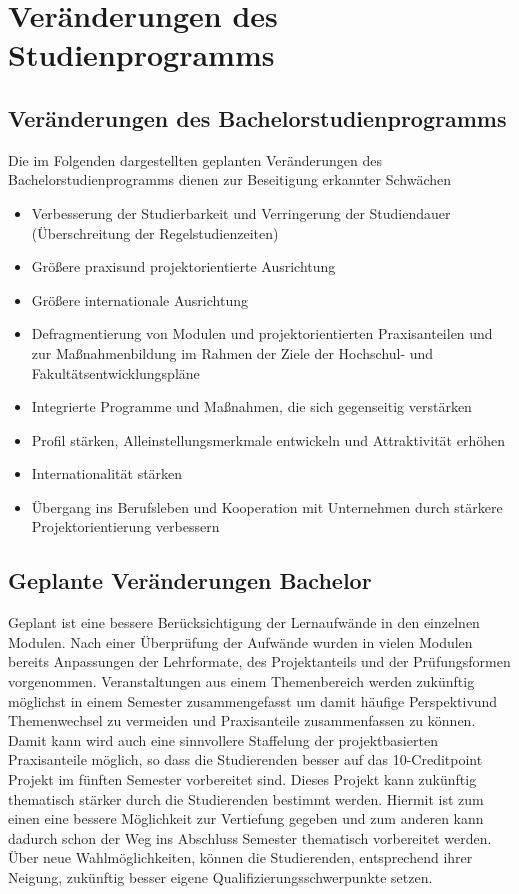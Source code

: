 \chapter{Veränderungen des
Studienprogramms}\label{veruxe4nderungen-des-studienprogramms}

\section{Veränderungen des
Bachelorstudienprogramms}\label{veruxe4nderungen-des-bachelorstudienprogramms}

Die im Folgenden dargestellten geplanten Veränderungen des
Bachelorstudienprogramms dienen zur Beseitigung erkannter Schwächen

\begin{itemize}
\tightlist
\item
  Verbesserung der Studierbarkeit und Verringerung der Studiendauer
  (Überschreitung der Regelstudienzeiten)
\item
  Größere praxisund projektorientierte Ausrichtung
\item
  Größere internationale Ausrichtung
\item
  Defragmentierung von Modulen und projektorientierten Praxisanteilen
  und zur Maßnahmenbildung im Rahmen der Ziele der Hochschul- und
  Fakultätsentwicklungspläne
\item
  Integrierte Programme und Maßnahmen, die sich gegenseitig verstärken
\item
  Profil stärken, Alleinstellungsmerkmale entwickeln und Attraktivität
  erhöhen
\item
  Internationalität stärken
\item
  Übergang ins Berufsleben und Kooperation mit Unternehmen durch
  stärkere Projektorientierung verbessern
\end{itemize}

\section{Geplante Veränderungen
Bachelor}\label{geplante-veruxe4nderungen-bachelor}

Geplant ist eine bessere Berücksichtigung der Lernaufwände in den
einzelnen Modulen. Nach einer Überprüfung der Aufwände wurden in vielen
Modulen bereits Anpassungen der Lehrformate, des Projektanteils und der
Prüfungsformen vorgenommen. Veranstaltungen aus einem Themenbereich
werden zukünftig möglichst in einem Semester zusammengefasst um damit
häufige Perspektivund Themenwechsel zu vermeiden und Praxisanteile
zusammenfassen zu können. Damit kann wird auch eine sinnvollere
Staffelung der projektbasierten Praxisanteile möglich, so dass die
Studierenden besser auf das 10-Creditpoint Projekt im fünften Semester
vorbereitet sind. Dieses Projekt kann zukünftig thematisch stärker durch
die Studierenden bestimmt werden. Hiermit ist zum einen eine bessere
Möglichkeit zur Vertiefung gegeben und zum anderen kann dadurch schon
der Weg ins Abschluss Semester thematisch vorbereitet werden. Über neue
Wahlmöglichkeiten, können die Studierenden, entsprechend ihrer Neigung,
zukünftig besser eigene Qualifizierungsschwerpunkte setzen.

